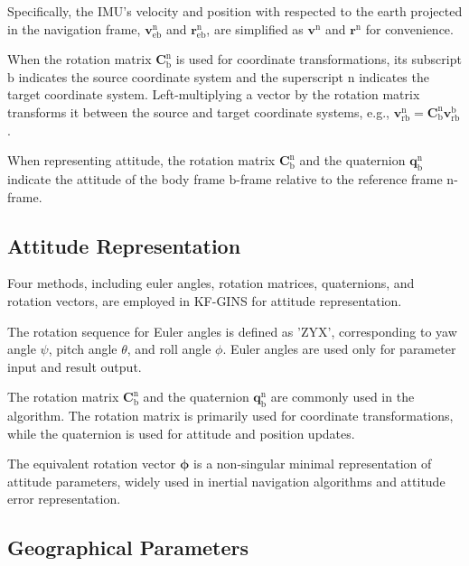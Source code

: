 \documentclass{article}
\begin{document}
Specifically, the IMU's velocity and position with respected to the earth projected in the navigation frame, $\boldsymbol{v}_{\mathrm{e}\mathrm{b}}^{\mathrm{n}}$ and $\boldsymbol{r}_{\mathrm{e}\mathrm{b}}^{\mathrm{n}}$, are simplified as $\boldsymbol{v}^{\mathrm{n}}$ and $\boldsymbol{r}^{\mathrm{n}}$ for convenience.

When the rotation matrix $\mathbf{C}_{\mathrm{b}}^{\mathrm{n}}$ is used for coordinate transformations, its subscript $\mathrm{b}$ indicates the source coordinate system and the superscript $\mathrm{n}$ indicates the target coordinate system. Left-multiplying a vector by the rotation matrix transforms it between the source and target coordinate systems, e.g., $\boldsymbol{v}_{\mathrm{r}\mathrm{b}}^{\mathrm{n}} = \mathbf{C}_{\mathrm{b}}^{\mathrm{n}} \boldsymbol{v}_{\mathrm{r}\mathrm{b}}^{\mathrm{b}}$.

When representing attitude, the rotation matrix $\mathbf{C}_{\mathrm{b}}^{\mathrm{n}}$ and the quaternion $\mathbf{q}_{\mathrm{b}}^{\mathrm{n}}$ indicate the attitude of the body frame $\mathrm{b}$-frame relative to the reference frame $\mathrm{n}$-frame.


\subsection{Attitude Representation}

Four methods, including euler angles, rotation matrices, quaternions, and rotation vectors, are employed in KF-GINS for attitude representation.

The rotation sequence for Euler angles is defined as 'ZYX', corresponding to yaw angle $\psi$, pitch angle $\theta$, and roll angle $\phi$. Euler angles are used only for parameter input and result output.

The rotation matrix $\mathbf{C}_{\mathrm{b}}^{\mathrm{n}}$ and the quaternion $\mathbf{q}_{\mathrm{b}}^{\mathrm{n}}$ are commonly used in the algorithm. The rotation matrix is primarily used for coordinate transformations, while the quaternion is used for attitude and position updates.

The equivalent rotation vector $\boldsymbol{\phi}$ is a non-singular minimal representation of attitude parameters, widely used in inertial navigation algorithms and attitude error representation.

\subsection{Geographical Parameters}
\end{document}
